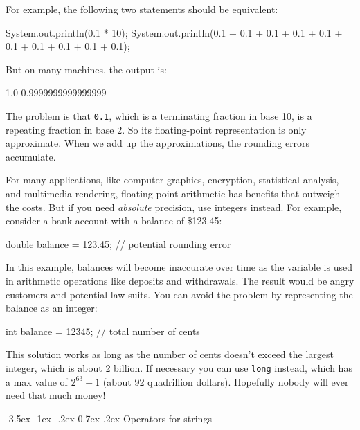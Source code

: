 \documentclass[12pt]{book}
\makeatletter
\renewcommand{\section}{\@startsection {section}{1}{\z@}%
    {-3.5ex \@plus -1ex \@minus -.2ex}%
    {0.7ex \@plus.2ex}%
    {\normalfont\Large\bfseries}}
\theoremstyle{exercise}
\newcommand{\java}[1]{\lstinline{#1}} %
\makeatother
\begin{document}
For example, the following two statements should be equivalent:

\begin{code}
    System.out.println(0.1 * 10);
    System.out.println(0.1 + 0.1 + 0.1 + 0.1 + 0.1
                     + 0.1 + 0.1 + 0.1 + 0.1 + 0.1);
\end{code}

But on many machines, the output is:

\begin{stdout}
1.0
0.9999999999999999
\end{stdout}

The problem is that \java{0.1}, which is a terminating fraction in base 10, is a repeating fraction in base 2.
So its floating-point representation is only approximate.
When we add up the approximations, the rounding errors accumulate.

For many applications, like computer graphics, encryption, statistical analysis, and multimedia rendering, floating-point arithmetic has benefits that outweigh the costs.
But if you need {\em absolute} precision, use integers instead.
For example, consider a bank account with a balance of \$123.45:

\begin{code}
    double balance = 123.45;  // potential rounding error
\end{code}

In this example, balances will become inaccurate over time as the variable is used in arithmetic operations like deposits and withdrawals.
The result would be angry customers and potential law suits.
You can avoid the problem by representing the balance as an integer:

\begin{code}
    int balance = 12345;      // total number of cents
\end{code}


This solution works as long as the number of cents doesn't exceed the largest integer, which is about 2 billion.
If necessary you can use \java{long} instead, which has a max value of $2^{63}-1$ (about 92 quadrillion dollars).
Hopefully nobody will ever need that much money!


\section{Operators for strings}

\end{document}
